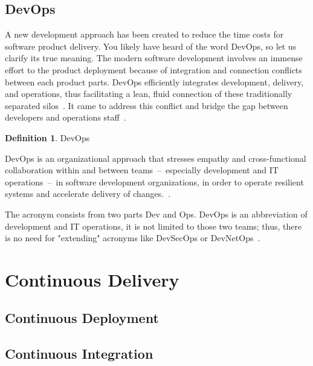 \documentclass[12pt,a4paper]{article}
\theoremstyle{definition}
\newtheorem{definition}{Definition}[section]
\begin{document}
    \subsection{DevOps}

    A new development approach has been created to reduce the time costs for software product delivery. You likely have heard of the word DevOps, so let us clarify its true meaning. The modern software development involves an immense effort to the product deployment because of integration and connection conflicts between each product parts. DevOps efficiently integrates development, delivery, and operations, thus facilitating a lean, fluid connection of these traditionally separated silos~\cite{7458761}. It came to address this conflict and bridge the gap between developers and operations staff~\cite{7339039}.

    \begin{definition}
        DevOps\\[-5mm]
        \begin{center}
            \begin{minipage}{0.9\textwidth}
                DevOps is an organizational approach that stresses empathy and cross-functional collaboration within and between teams~--~especially development and IT operations~--~in software development organizations, in order to operate resilient systems and accelerate delivery of changes.~\cite{7169442}.\\[-2.5mm]
            \end{minipage}
        \end{center}
    \end{definition}

    The acronym consists from two parts Dev and Ops. DevOps is an abbreviation of development and IT operations, it is not limited to those two teams; thus, there is no need for "extending" acronyms like DevSecOps or DevNetOps~\cite{7169442}.

\section{Continuous Delivery}

    \subsection{Continuous Deployment}

    \subsection{Continuous Integration}
\end{document}
